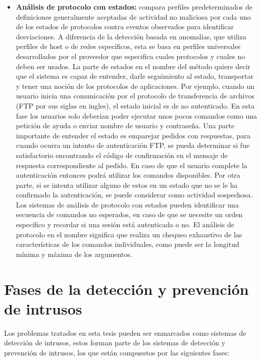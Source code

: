 \begin{itemize}
    \item \textbf{Análisis de protocolo con estados:} compara perfiles predeterminados de definiciones generalmente aceptadas de actividad no maliciosa por cada uno de los estados de protocolos contra eventos observados para identificar desviaciones. A diferencia de la detección basada en anomalías, que utiliza perfiles de host o de redes específicos, esta se basa en perfiles universales desarrollados por el proveedor que especifica cuales protocolos y cuales no deben ser usados. La parte de estados en el nombre del método quiere decir que el sistema es capaz de entender, darle seguimiento al estado, transportar y tener una noción de los protocolos de aplicaciones. Por ejemplo, cuando un usuario inicia una comunicación por el protocolo de transferencia de archivos (FTP por sus siglas en ingles), el estado inicial es de no autenticado. En esta fase los usuarios solo deberían poder ejecutar unos pocos comandos como una petición de ayuda o enviar nombre de usuario y contraseña. Una parte importante de entender el estado es emparejar pedidos con respuestas, para cuando ocurra un intento de autenticación FTP, se pueda determinar si fue satisfactorio encontrando el código de confirmación en el mensaje de respuesta correspondiente al pedido. En caso de que el usuario complete la autenticación entonces podrá utilizar los comandos disponibles. Por otra parte, si se intenta utilizar alguno de estos en un estado que no se le ha confirmado la autenticación, se puede considerar como actividad sospechosa. Los sistemas de análisis de protocolo con estados pueden identificar una secuencia de comandos no esperados, en caso de que se necesite un orden específico y recordar si una sesión está autenticada o no. El análisis de protocolo en el nombre significa que realiza un chequeo exhaustivo de las características de los comandos individuales, como puede ser la longitud mínima y máxima de los argumentos.
\end{itemize}

\section{Fases de la detección y prevención de intrusos}
Los problemas tratados en esta tesis pueden ser enmarcados como sistemas de detección de intrusos, estos forman parte de los sistemas de detección y prevención de intrusos, los que están compuestos por las siguientes fases:

